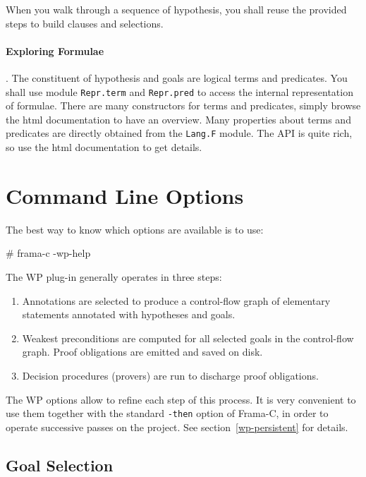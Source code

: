 When you walk through a sequence of hypothesis, you shall reuse the provided steps to build clauses and selections.

\paragraph{Exploring Formulae}.
The constituent of hypothesis and goals are logical terms and predicates. You shall use
module \lstinline$Repr.term$ and \lstinline$Repr.pred$ to access the internal representation
of formulae. There are many constructors for terms and predicates, simply browse the html documentation to have an overview. Many properties about terms and predicates are directly obtained from the \lstinline$Lang.F$ module. The API is quite rich, so use the html documentation to get details.

\clearpage
\section{Command Line Options}
\label{wp-cmdline}

The best way to know which options are available is to use:
\begin{shell}
# frama-c -wp-help
\end{shell}

The \textsf{WP} plug-in generally operates in three steps:
\begin{enumerate}
\item Annotations are selected to produce a control-flow graph of
  elementary statements annotated with hypotheses and goals.
\item Weakest preconditions are computed for all selected goals in the
  control-flow graph. Proof obligations are emitted and saved on disk.
\item Decision procedures (provers) are run to discharge proof obligations.
\end{enumerate}

The \textsf{WP} options allow to refine each step of this process. It
is very convenient to use them together with the standard \texttt{-then}
option of \textsf{Frama-C}, in order to operate successive passes on the project.
See section~\ref{wp-persistent} for details.

\subsection{Goal Selection}

